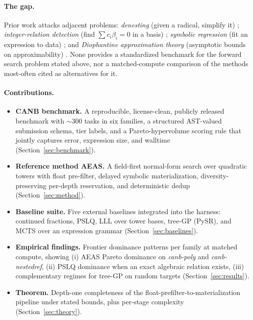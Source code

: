 \documentclass[11pt]{article}
\begin{document}
\paragraph{The gap.} Prior work attacks adjacent problems: \emph{denesting} (given a radical, simplify it) \cite{landau89, zippel85, blomer92}; \emph{integer-relation detection} (find $\sum c_i \beta_i = 0$ in a basis) \cite{ferguson99, lll82}; \emph{symbolic regression} (fit an expression to data) \cite{kammerer21, kahlmeyer24, lacava21srbench, franca24srbenchpp, koza92}; and \emph{Diophantine approximation theory} (asymptotic bounds on approximability) \cite{roth55, schmidt75, bugeaud04}. None provides a standardized benchmark for the forward search problem stated above, nor a matched-compute comparison of the methods most-often cited as alternatives for it.

\paragraph{Contributions.}
\begin{itemize}
  \item \textbf{CANB benchmark.} A reproducible, license-clean, publicly released benchmark with $\sim 300$ tasks in six families, a structured AST-valued submission schema, tier labels, and a Pareto-hypervolume scoring rule that jointly captures error, expression size, and walltime (Section~\ref{sec:benchmark}).
  \item \textbf{Reference method AEAS.} A field-first normal-form search over quadratic towers with float pre-filter, delayed symbolic materialization, diversity-preserving per-depth reservation, and deterministic dedup (Section~\ref{sec:method}).
  \item \textbf{Baseline suite.} Five external baselines integrated into the harness: continued fractions, PSLQ, LLL over tower bases, tree-GP (PySR), and MCTS over an expression grammar (Section~\ref{sec:baselines}).
  \item \textbf{Empirical findings.} Frontier dominance patterns per family at matched compute, showing (i) AEAS Pareto dominance on \textit{canb-poly} and \textit{canb-nestedref}, (ii) PSLQ dominance when an exact algebraic relation exists, (iii) complementary regimes for tree-GP on random targets (Section~\ref{sec:results}).
  \item \textbf{Theorem.} Depth-one completeness of the float-prefilter-to-materialization pipeline under stated bounds, plus per-stage complexity (Section~\ref{sec:theory}).
\end{itemize}
\end{document}
